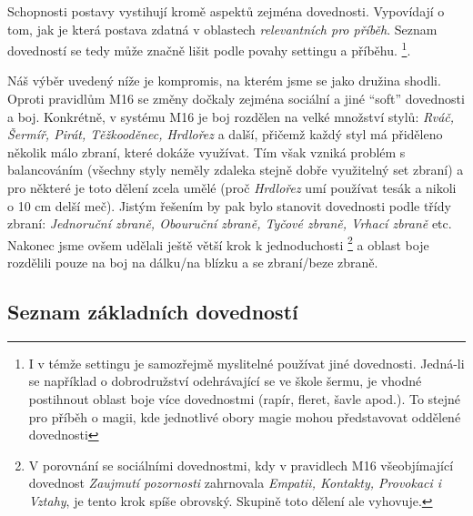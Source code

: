 \documentclass[../main.tex]{subfiles}
\begin{document}
Schopnosti postavy vystihují kromě aspektů zejména dovednosti. Vypovídají o tom, jak je která postava zdatná v oblastech \textit{relevantních pro příběh}. Seznam dovedností se tedy může značně lišit podle povahy settingu a příběhu. \footnote{I v témže settingu je samozřejmě myslitelné používat jiné dovednosti. Jedná-li se například o dobrodružství odehrávající se ve škole šermu, je vhodné postihnout oblast boje více dovednostmi (rapír, fleret, šavle apod.). To stejné pro příběh o magii, kde jednotlivé obory magie mohou představovat oddělené dovednosti}.

Náš výběr uvedený níže je kompromis, na kterém jsme se jako družina shodli. Oproti pravidlům M16 se změny dočkaly zejména sociální a jiné ``soft'' dovednosti a boj. Konkrétně, v systému M16 je boj rozdělen na velké množství stylů: \textit{Rváč, Šermíř, Pirát, Těžkooděnec, Hrdlořez} a další, přičemž každý styl má přiděleno několik málo zbraní, které dokáže využívat. Tím však vzniká problém s balancováním (všechny styly neměly zdaleka stejně dobře využitelný set zbraní) a pro některé je toto dělení zcela umělé (proč \textit{Hrdlořez} umí používat tesák a nikoli o 10 cm delší meč). Jistým řešením by pak bylo stanovit dovednosti podle třídy zbraní: \textit{Jednoruční zbraně, Obouruční zbraně, Tyčové zbraně, Vrhací zbraně} etc. Nakonec jsme ovšem udělali ještě větší krok k jednoduchosti \footnote{V porovnání se sociálními dovednostmi, kdy v pravidlech M16 všeobjímající dovednost \textit{Zaujmutí pozornosti} zahrnovala \textit{Empatii, Kontakty, Provokaci i Vztahy}, je tento krok spíše obrovský. Skupině toto dělení ale vyhovuje.} a oblast boje rozdělili pouze na boj na dálku/na blízku a se zbraní/beze zbraně.


\subsection{Seznam základních dovedností}
\label{sec:seznam-dov}
\end{document}
